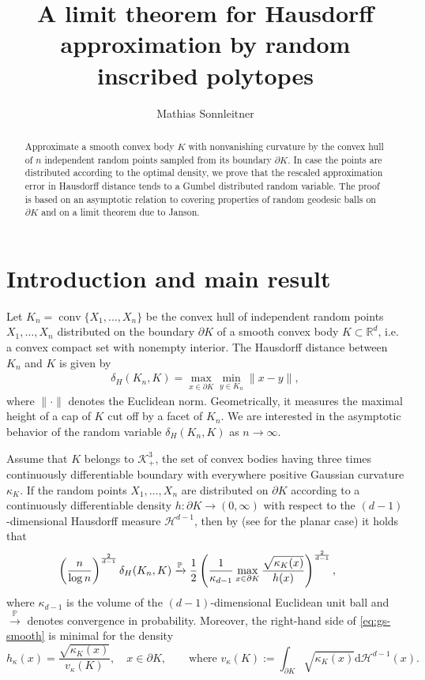 \documentclass[a4paper,12pt,reqno]{amsart}
\title[A limit theorem for random inscribed polytopes]{A limit theorem for Hausdorff approximation by random inscribed polytopes}
\author[M.~Sonnleitner]{Mathias Sonnleitner}
\theoremstyle{definition}
\newcommand{\IR}{\mathbb{R}}
\newcommand{\cH}{\mathcal{H}}
\newcommand{\cK}{\mathcal{K}}
\DeclareMathOperator{\conv}{conv}
\newcommand{\dd}{\mathrm{d}}
\begin{document}
\begin{abstract}	
Approximate a smooth convex body $K$ with nonvanishing curvature by the convex hull of $n$ independent random points sampled from its boundary $\partial K$. In case the points are distributed according to the optimal density, we prove that the rescaled approximation error in Hausdorff distance tends to a Gumbel distributed random variable.  The proof is based on an asymptotic relation to covering properties of random geodesic balls on $\partial K$ and on a limit theorem due to Janson.

\end{abstract}

\maketitle

\section{Introduction and main result}

Let $K_n=\conv\{X_1,\dots,X_n\}$ be the convex hull of independent random points $X_1,\dots,X_n$ distributed on the boundary $\partial K$ of a smooth convex body $K\subset \IR^d$, i.e. a convex compact set with nonempty interior. The Hausdorff distance between $K_n$ and $K$ is given by
\begin{align*}
\delta_H(K_n,K)
=\max_{x\in \partial K}\min_{y\in K_n}\|x-y\|,
\end{align*}
where $\|\cdot\|$ denotes the Euclidean norm. Geometrically, it measures the maximal height of a cap of $K$ cut off by a facet of $K_n$. We are interested in the asymptotic behavior of the random variable $\delta_H(K_n,K)$ as $n\to \infty$. 

Assume that $K$ belongs to $\cK^3_+$, the set of convex bodies having three times continuously differentiable boundary with everywhere positive Gaussian curvature $\kappa_K$. If the random points $X_1,\dots,X_n$ are distributed on $\partial K$ according to a continuously differentiable density $h\colon \partial K\to (0,\infty)$ with respect to the $(d-1)$-dimensional Hausdorff measure $\cH^{d-1}$, then by \cite{GS96} (see \cite{Sch88} for the planar case) it holds that
\begin{equation}
	\label{eq:gs-smooth}
\hskip -5mm
\left(\frac{n}{\log n}\right)^{\frac{2}{d-1}}\delta_{H}(K_n,K)
\xrightarrow[]{\mathbb{P}}
\frac{1}{2}\left(
\frac{1}{\kappa_{d-1}}\max_{x\in\partial K}\frac{\sqrt{\kappa_{K}(x)}}{h(x)}
\right)^{\frac{2}{d-1}},
\end{equation}
where $\kappa_{d-1}$ is the volume of the $(d-1)$-dimensional Euclidean unit ball and $\overset{\mathbb{P}}{\to}$ denotes convergence in probability. Moreover, the right-hand side of \eqref{eq:gs-smooth} is minimal for the density 
\begin{equation} \label{eq:h-opt}
h_{\kappa}(x)
=\frac{\sqrt{\kappa_K(x)}}{v_{\kappa}(K)}, \quad x\in \partial K, \qquad \text{where }
v_{\kappa}(K):=\int_{\partial K} \sqrt{\kappa_K(x)}\dd \cH^{d-1}(x).
\end{equation}
\end{document}
